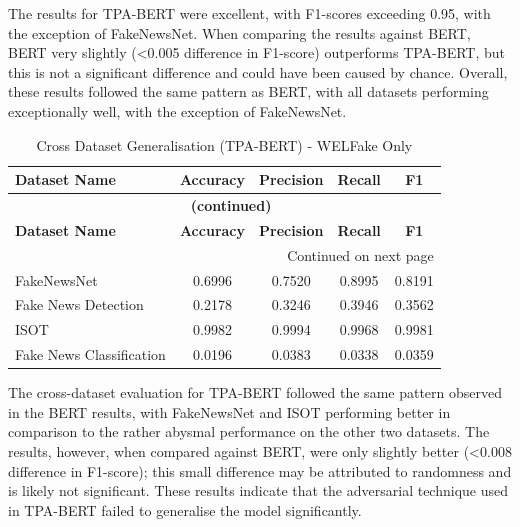 \documentclass[
]{article}
\begin{document}
The results for TPA-BERT were excellent, with F1-scores exceeding 0.95, with the exception of FakeNewsNet. When comparing the results against BERT, BERT very slightly (<0.005 difference in F1-score) outperforms TPA-BERT, but this is not a significant difference and could have been caused by chance. Overall, these results followed the same pattern as BERT, with all datasets performing exceptionally well, with the exception of FakeNewsNet.

\begingroup
\setlength{\tabcolsep}{3pt}
\renewcommand{\arraystretch}{1.3}
\setlength\LTleft{0pt}
\setlength\LTright{0pt}
\begin{longtable}{@{} l c c c c @{}}
\caption{Cross Dataset Generalisation (TPA-BERT) - WELFake Only} \label{tab:tpa_bert_cross_results} \\
\toprule
\textbf{Dataset Name} & \textbf{Accuracy} & \textbf{Precision} & \textbf{Recall} & \textbf{F1} \\
\midrule
\endfirsthead

\multicolumn{5}{c}{{\bfseries \tablename\ \thetable{} (continued)}} \\
\toprule
\textbf{Dataset Name} & \textbf{Accuracy} & \textbf{Precision} & \textbf{Recall} & \textbf{F1} \\
\midrule
\endhead

\bottomrule
\multicolumn{5}{r}{{Continued on next page}} \\
\endfoot

\bottomrule
\endlastfoot
FakeNewsNet & 0.6996 & 0.7520 & 0.8995 & 0.8191 \\
Fake News Detection & 0.2178 & 0.3246 & 0.3946 & 0.3562 \\
ISOT & 0.9982 & 0.9994 & 0.9968 & 0.9981 \\
Fake News Classification & 0.0196 & 0.0383 & 0.0338 & 0.0359 \\
\end{longtable}
\endgroup

The cross-dataset evaluation for TPA-BERT followed the same pattern observed in the BERT results, with FakeNewsNet and ISOT performing better in comparison to the rather abysmal performance on the other two datasets. The results, however, when compared against BERT, were only slightly better (<0.008 difference in F1-score); this small difference may be attributed to randomness and is likely not significant. These results indicate that the adversarial technique used in TPA-BERT failed to generalise the model significantly. 
\end{document}
